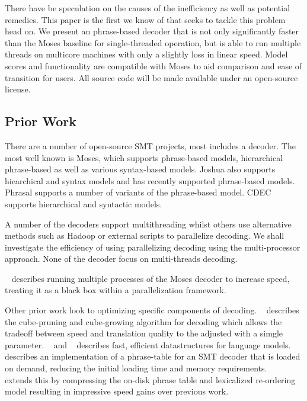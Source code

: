\documentclass[11pt]{article}
\begin{document}
There have be speculation on the causes of the inefficiency as well as potential remedies. This paper is the first we know of that seeks to tackle this problem head on. We present an phrase-based decoder that is not only significantly faster than the Moses baseline for single-threaded operation, but is able to run multiple threads on multicore machines with only a slightly loss in linear speed. Model scores and functionality are compatible with Moses to aid comparison and ease of transition for users. All source code will be made available under an open-source license.

\subsection{Prior Work}

There are a number of open-source SMT projects, most includes a decoder. The most well known is Moses, which supports phrase-based models, hierarchical phrase-based as well as various syntax-based models. Joshua also supports hiearchical and syntax models and has recently supported phrase-based models. Phrasal supports a number of variants of the phrase-based model. CDEC supports hierarchical and syntactic models.

A number of the decoders support multithreading whilst others use alternative methods such as Hadoop or external scripts to parallelize decoding. We shall investigate the efficiency of using parallelizing decoding using the multi-processor approach. None of the decoder focus on multi-threads decoding. 

~ describes running multiple processes of the Moses decoder to increase speed, treating it as a black box within a parallelization framework.

Other prior work look to optimizing specific components of decoding. ~ describes the cube-pruning and cube-growing algorithm for decoding which allows the tradeoff between speed and translation quality to the adjusted with a simgle parameter. ~ and ~ describes fast, efficient datastructures for language models. ~ describes an implementation of a phrase-table for an SMT decoder that is loaded on demand, reducing the initial loading time and memory requirements. ~ extends this by compressing the on-disk phrase table and lexicalized re-ordering model resulting in impressive speed gains over previous work.
\end{document}
